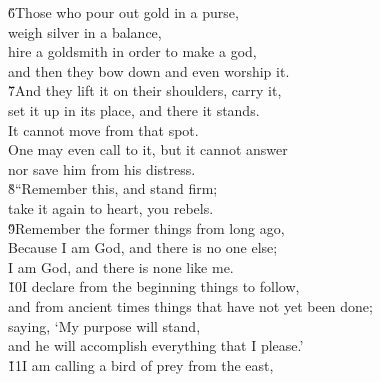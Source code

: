 \begin{poetry}
\poeml \v{6}Those who pour out gold in a purse, \\
\poemll    weigh silver in a balance, \\
\poeml hire a goldsmith in order to make a god, \\
\poemll    and then they bow down and even worship it. \\
\poeml \v{7}And they lift it on their shoulders, carry it, \\
\poemll    set it up in its place, and there it stands. \\
\poemlll       It cannot move from that spot. \\
\poeml One may even call to it, but it cannot answer \\
\poemll    nor save him from his distress. \\
\poeml \v{8}``Remember this, and stand firm; \\
\poemll    take it again to heart, you rebels. \\
\poeml \v{9}Remember the former things from long ago, \\
\poemll    Because I am God, and there is no one else; \\
\poemlll       I am God, and there is none like me. \\
\poeml \v{10}I declare from the beginning things to follow, \\
\poemll    and from ancient times things that have not yet been done; \\
\poeml saying, `My purpose will stand, \\
\poemll    and he will accomplish everything that I please.' \\
\poeml \v{11}I am calling a bird of prey from the east, \\

\end{poetry}
